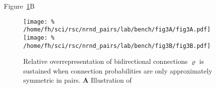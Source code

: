 Figure~\ref{fig:sym_fail}B

\begin{figure}[h!]
\centering
\texttt{[image: \%
  /home/fh/sci/rsc/nrnd\_pairs/lab/bench/fig3A/fig3A.pdf]}
\texttt{[image: \%
/home/fh/sci/rsc/nrnd\_pairs/lab/bench/fig3B/fig3B.pdf]}
\caption{Relative overrepresentation of bidirectional connections $\varrho$ is sustained when connection probabilities are only approximately symmetric in pairs. \textbf{A} Illustration of }
\label{fig:sym_fail}
\end{figure}


%

